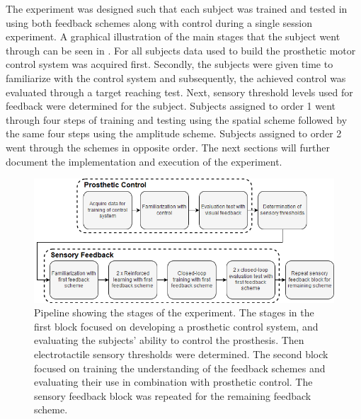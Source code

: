 The experiment was designed such that each subject was trained and tested in using both feedback schemes along with control during a single session experiment. A graphical illustration of the main stages that the subject went through can be seen in . For all subjects data used to build the prosthetic motor control system was acquired first. Secondly, the subjects were given time to familiarize with the control system and subsequently, the achieved control was evaluated through a target reaching test. Next, sensory threshold levels used for feedback were determined for the subject. Subjects assigned to order 1 went through four steps of training and testing using the spatial scheme followed by the same four steps using the amplitude scheme. Subjects assigned to order 2 went through the schemes in opposite order. The next sections will further document the implementation and execution of the experiment.     

\begin{figure}[H]                 
	\includegraphics[width=.95\textwidth]{figures/std_paper}
	\caption{Pipeline showing the stages of the experiment. The stages in the first block focused on developing a prosthetic control system, and evaluating the
		subjects’ ability to control the prosthesis. Then electrotactile sensory thresholds were determined. The second block focused on training the understanding of
		the feedback schemes and evaluating their use in combination with prosthetic control. The sensory feedback block was repeated for the remaining feedback
		scheme.}
	\label{fig:std} 
\end{figure}